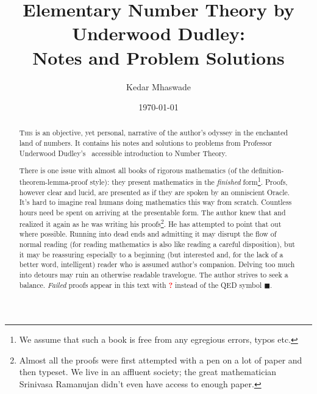 \documentclass[english,notitlepage,smartquotes]{hgbreport}
\theoremstyle{definition}
\theoremstyle{remark}
\theoremstyle{plain}
\begin{document}
\author{Kedar Mhaswade}                    %
\title{Elementary Number Theory by Underwood Dudley:\\ %
			Notes and Problem Solutions}	                 %
\date{\today}

\maketitle
\begin{abstract}\noindent

\bigskip
\noindent
\lettrine[lines=3]{T}{his} is an objective, yet personal, narrative of the author's odyssey in the enchanted land of numbers. It contains his notes and solutions to problems from Professor Underwood Dudley's~\cite{Dudley2008} accessible introduction to Number Theory.

There is one issue with almost all books of rigorous mathematics (of the definition-theorem-lemma-proof style): they present mathematics in the \emph{finished} form\footnote{We assume that such a book is free from any egregious errors, typos etc.}. Proofs, however clear and lucid, are presented as if they are spoken by an omniscient Oracle. It's hard to imagine real humans doing mathematics this way from scratch. Countless hours need be spent on arriving at the presentable form. The author knew that and realized it again as he was writing his proofs\footnote{Almost all the proofs were first attempted with a pen on a lot of paper and then typeset. We live in an affluent society; the great mathematician Srinivasa Ramanujan didn't even have access to enough paper.}. He has attempted to point that out where possible. Running into dead ends and admitting it may disrupt the flow of normal reading (for reading mathematics is also like reading a careful disposition), but it may be reassuring especially to a beginning (but interested and, for the lack of a better word, intelligent) reader who is assumed author's companion. Delving too much into detours may ruin an otherwise readable travelogue. The author strives to seek a balance. \emph{Failed} proofs appear in this text with {\textcolor{red}{\Huge\bf ?}} instead of the QED symbol $\blacksquare$.


\end{abstract}
\end{document}
